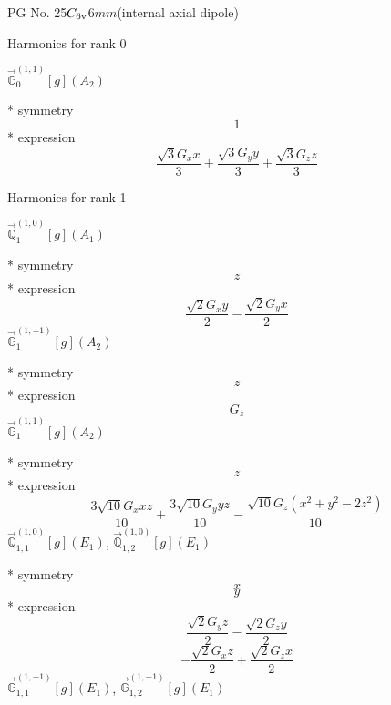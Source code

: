 \documentclass[fleqn,8pt]{jsarticle}
\begin{document}
\setcounter{MaxMatrixCols}{32}

\renewcommand{\tablename}{Table~}
\renewcommand{\figurename}{Figure~}
\begin{center}
\LARGE
PG No. 25\quad$C_{\rm 6v}$\quad$6mm$\quad[ hexagonal ] (internal axial dipole)
\end{center}

\noindent * Harmonics for rank 0

\noindent\quad $\vec{\mathbb{G}}_{0}^{(1,1)}[g](A_{2})$

\noindent\quad ** symmetry
\begin{dmath*}
1
\end{dmath*}
\noindent\quad ** expression
\begin{dmath*}
\frac{\sqrt{3} G_{x} x}{3} + \frac{\sqrt{3} G_{y} y}{3} + \frac{\sqrt{3} G_{z} z}{3}
\end{dmath*}

\noindent * Harmonics for rank 1

\noindent\quad $\vec{\mathbb{Q}}_{1}^{(1,0)}[g](A_{1})$

\noindent\quad ** symmetry
\begin{dmath*}
z
\end{dmath*}
\noindent\quad ** expression
\begin{dmath*}
\frac{\sqrt{2} G_{x} y}{2} - \frac{\sqrt{2} G_{y} x}{2}
\end{dmath*}
\noindent\quad $\vec{\mathbb{G}}_{1}^{(1,-1)}[g](A_{2})$

\noindent\quad ** symmetry
\begin{dmath*}
z
\end{dmath*}
\noindent\quad ** expression
\begin{dmath*}
G_{z}
\end{dmath*}
\noindent\quad $\vec{\mathbb{G}}_{1}^{(1,1)}[g](A_{2})$

\noindent\quad ** symmetry
\begin{dmath*}
z
\end{dmath*}
\noindent\quad ** expression
\begin{dmath*}
\frac{3 \sqrt{10} G_{x} x z}{10} + \frac{3 \sqrt{10} G_{y} y z}{10} - \frac{\sqrt{10} G_{z} \left(x^{2} + y^{2} - 2 z^{2}\right)}{10}
\end{dmath*}
\noindent\quad $\vec{\mathbb{Q}}_{1,1}^{(1,0)}[g](E_{1})$, $\vec{\mathbb{Q}}_{1,2}^{(1,0)}[g](E_{1})$

\noindent\quad ** symmetry
\begin{dmath*}
x
\end{dmath*}
\begin{dmath*}
y
\end{dmath*}
\noindent\quad ** expression
\begin{dmath*}
\frac{\sqrt{2} G_{y} z}{2} - \frac{\sqrt{2} G_{z} y}{2}
\end{dmath*}
\begin{dmath*}
- \frac{\sqrt{2} G_{x} z}{2} + \frac{\sqrt{2} G_{z} x}{2}
\end{dmath*}
\noindent\quad $\vec{\mathbb{G}}_{1,1}^{(1,-1)}[g](E_{1})$, $\vec{\mathbb{G}}_{1,2}^{(1,-1)}[g](E_{1})$
\end{document}
